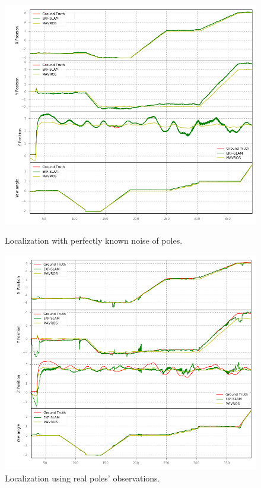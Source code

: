 \begin{figure}
    \centering
    \includegraphics[width=\textwidth]{Images/fig20-exp-a1}
    \caption{Localization with perfectly known noise of poles.}
    \label{fig:chapter3:simulation:experimentsA:a}
    \centering
    \includegraphics[width=\textwidth]{Images/fig20-exp-a2}
    \caption{Localization using real poles' observations.}
    \label{fig:chapter3:simulation:experimentsA:b}
\end{figure}


